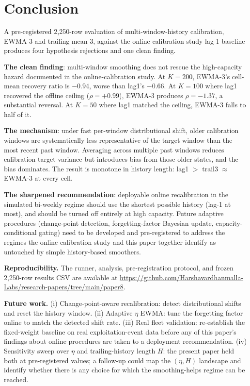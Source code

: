 \section{Conclusion}
\label{sec:conclusion}

A pre-registered 2{,}250-row evaluation of multi-window-history
calibration, EWMA-3 and trailing-mean-3, against the online-calibration study
lag-1 baseline produces four hypothesis rejections and one clean
finding.

\textbf{The clean finding}: multi-window smoothing does not rescue
the high-capacity hazard documented in the online-calibration study. At $K = 200$, EWMA-3's
cell-mean recovery ratio is $-0.94$, worse than \textsf{lag1}'s
$-0.66$. At $K = 100$ where \textsf{lag1} recovered the offline
ceiling ($\rho = +0.99$), EWMA-3 produces $\rho = -1.37$, a
substantial reversal. At $K = 50$ where \textsf{lag1} matched the
ceiling, EWMA-3 falls to half of it.

\textbf{The mechanism}: under fast per-window distributional shift,
older calibration windows are systematically less representative of
the target window than the most recent past window. Averaging across
multiple past windows reduces calibration-target variance but
introduces bias from those older states, and the bias dominates.
The result is monotone in history length: \textsf{lag1} $>$
\textsf{trail3} $\approx$ EWMA-3 at every cell.

\textbf{The sharpened recommendation}: deployable online
recalibration in the simulated bi-weekly regime should use the
shortest possible history (lag-1 at most), and should be turned off
entirely at high capacity. Future adaptive procedures
(change-point detection, forgetting-factor Bayesian update,
capacity-conditional gating) need to be developed and
pre-registered to address the regimes the online-calibration study and this paper together
identify as untouched by simple history-based smoothers.

\textbf{Reproducibility.} The runner, analysis, pre-registration
protocol, and frozen 2{,}250-row results CSV are available at
\url{https://github.com/Harshavardhanmalla-Labs/research-papers/tree/main/paper8}.

\textbf{Future work.} (i) Change-point-aware recalibration: detect
distributional shifts and reset the history window. (ii) Adaptive
$\eta$ EWMA: tune the forgetting factor online to match the
detected shift rate. (iii) Real fleet validation: re-establish the
fixed-weight baseline on real exploitation-event data before any of
this paper's findings about online procedures are taken to a
deployment recommendation. (iv) Sensitivity sweep over $\eta$ and
trailing-history length $H$: the present paper held both at
pre-registered values; a follow-up could map the $(\eta, H)$
landscape and identify whether there is any choice for which the
smoothing-helps regime can be reached.
